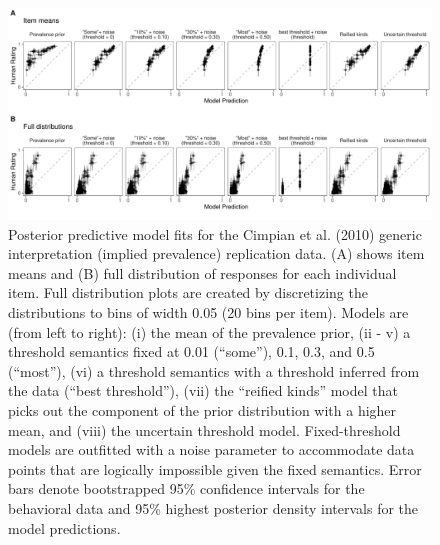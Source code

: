 \documentclass[floatsintext,man]{apa6}
\begin{document}

\begin{figure}
\centering
\includegraphics{figs/cimpian-modelingResults-plotgrid-scatters.pdf}
\caption{\label{fig:cimpian-modelingResults-scatters}Posterior predictive model fits for the Cimpian et al. (2010) generic interpretation (implied prevalence) replication data. (A) shows item means and (B) full distribution of responses for each individual item. Full distribution plots are created by discretizing the distributions to bins of width 0.05 (20 bins per item). Models are (from left to right): (i) the mean of the prevalence prior, (ii - v) a threshold semantics fixed at 0.01 (\enquote{some}), 0.1, 0.3, and 0.5 (``most''), (vi) a threshold semantics with a threshold inferred from the data (``best threshold''), (vii) the ``reified kinds'' model that picks out the component of the prior distribution with a higher mean, and (viii) the uncertain threshold model. Fixed-threshold models are outfitted with a noise parameter to accommodate data points that are logically impossible given the fixed semantics. Error bars denote bootstrapped 95\% confidence intervals for the behavioral data and 95\% highest posterior density intervals for the model predictions.}
\end{figure}
\end{document}
